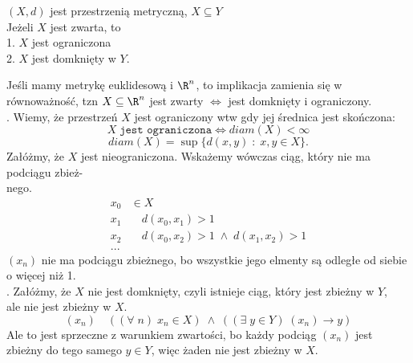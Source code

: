 \bigskip
\begin{center}\large
    $(X, d)$ jest przestrzenią metryczną, $X\subseteq Y$\smallskip\\
    {\color{def}Jeżeli $X$ jest zwarta, to}\medskip\\
    1. $X$ jest ograniczona\smallskip\\
    2. $X$ jest domknięty w $Y$.
\end{center}\bigskip
Jeśli mamy metrykę euklidesową i $\R^n$, to implikacja zamienia się w równoważność, tzn $X\subseteq \R^n$ jest zwarty $\iff$ jest domknięty i ograniczony.\bigskip\\
\dowod
{}. Wiemy, że przestrzeń $X$ jest ograniczony wtw gdy jej średnica jest skończona:
$$X\;\texttt{jest ograniczona}\iff diam(X)<\infty$$
$$diam(X) = \sup\{d(x,y)\;:\;x,y\in X\}.$$
Załóżmy, że $X$ jest nieograniczona. Wskażemy wówczas ciąg, który nie ma podciągu zbież-\\nego.
\begin{align*}
    x_0&\in X\\
    x_1&\quad d(x_0,x_1)>1\\
    x_2&\quad d(x_0, x_2)>1\;\land\;d(x_1, x_2)>1\\
    ...&
\end{align*}
$(x_n)$ nie ma podciągu zbieżnego, bo wszystkie jego elmenty są odległe od siebie o więcej niż 1.\bigskip\\
. Załóżmy, że $X$ nie jest domknięty, czyli istnieje ciąg, który jest zbieżny w $Y$, \\ale nie jest zbieżny w $X$. 
$$(x_n)\quad ((\forall\;n)\;x_n\in X)\;\land\;((\exists\;y\in Y)\;(x_n)\to y)$$
Ale to jest sprzeczne z warunkiem zwartości, bo każdy podciąg $(x_n)$ jest zbieżny do tego samego $y\in Y$, więc żaden nie jest zbieżny w $X$.
\kondow\bigskip
{}\bigskip

